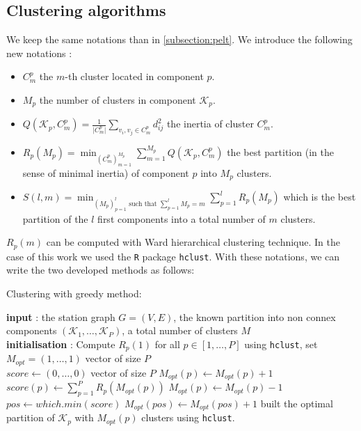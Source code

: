 \begin{appendices}
\section{Clustering algorithms}\label{app:clustalgo:chap5}

We keep the same notations than in \ref{subsection:pelt}. We introduce the following new notations : 
\begin{itemize}
    \item $C_m^p$ the $m$-th cluster located in component $p$.
    \item $M_p$ the number of clusters in component $\mathcal{K}_p$.
    \item $\displaystyle Q(\mathcal{K}_p,C_m^p) = \frac{1}{\lvert C_m^p\rvert}\sum_{v_i,v_j \in C_m^p}d_{ij}^2$ the inertia of cluster $C^p_m$.
    \item $\displaystyle R_p(M_p) = \min_{(C_m^p)_{m=1}^{M_p}}\sum_{m = 1}^{M_p}Q(\mathcal{K}_p,C_m^p)$ the best partition (in the sense of minimal inertia) of component $p$ into $M_p$ clusters. 
    \item $\displaystyle S(l,m) = \min_{(M_p)_{p=1}^l \text{ such that } \sum_{p=1}^l M_p = m}\sum_{p=1}^lR_p(M_p)$ which is the best partition of the $l$ first components into a total number of $m$ clusters.
\end{itemize}

$R_p(m)$ can be computed with Ward hierarchical clustering technique. In the case of this work we used the \texttt{R} package \texttt{hclust}. With these notations, we can write the two developed methods as follows: 

\begin{algorithm}[ht]
\caption{Clustering with greedy method:}\label{algo:greed}
\begin{algorithmic}

\State \textbf{input} : the station graph $G=(V,E)$, the known partition into non connex components $(\mathcal{K_1},\dots,\mathcal{K}_P)$, a total number of clusters $M$ \\
  
\State \textbf{initialisation} : Compute $R_p(1)$ for all $p \in [1,\dots,P]$ using \texttt{hclust}, set $M_{opt} = (1,\dots,1)$ vector of size $P$  \\

  \State $\textit{score}\gets(0,\dots,0)$ vector of size $P$
  \State $M_{opt}(p) \gets M_{opt}(p) + 1$
  \State $\textit{score}(p) \gets \sum_{p=1}^P R_p(M_{opt}(p))$
  \State $M_{opt}(p) \gets M_{opt}(p) - 1$
  \EndFor
  \State $\textit{pos} \gets which.min(\textit{score})$
  \State $M_{opt}(pos) \gets M_{opt}(pos)+1$
\EndFor
{}
\State built the optimal partition of $\mathcal{K}_p$ with $M_{opt}(p)$ clusters using \texttt{hclust}.
\EndFor


\end{algorithmic}
\end{algorithm}
\end{appendices}

